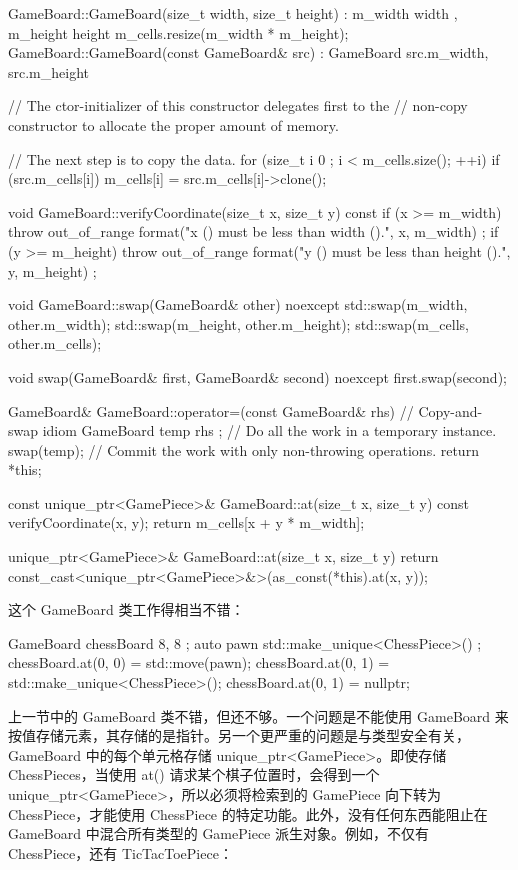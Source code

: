 \begin{cpp}
GameBoard::GameBoard(size_t width, size_t height)
    : m_width { width }, m_height { height }
{
    m_cells.resize(m_width * m_height);
}
GameBoard::GameBoard(const GameBoard& src)
    : GameBoard { src.m_width, src.m_height }
{
    // The ctor-initializer of this constructor delegates first to the
    // non-copy constructor to allocate the proper amount of memory.

    // The next step is to copy the data.
    for (size_t i { 0 }; i < m_cells.size(); ++i) {
        if (src.m_cells[i]) {
            m_cells[i] = src.m_cells[i]->clone();
        }
    }
}

void GameBoard::verifyCoordinate(size_t x, size_t y) const
{
    if (x >= m_width) {
        throw out_of_range {
            format("x ({}) must be less than width ({}).", x, m_width) };
    }
    if (y >= m_height) {
        throw out_of_range {
            format("y ({}) must be less than height ({}).", y, m_height) };
    }
}

void GameBoard::swap(GameBoard& other) noexcept
{
    std::swap(m_width, other.m_width);
    std::swap(m_height, other.m_height);
    std::swap(m_cells, other.m_cells);
}

void swap(GameBoard& first, GameBoard& second) noexcept
{
    first.swap(second);
}

GameBoard& GameBoard::operator=(const GameBoard& rhs)
{
    // Copy-and-swap idiom
    GameBoard temp { rhs }; // Do all the work in a temporary instance.
    swap(temp); // Commit the work with only non-throwing operations.
    return *this;
}

const unique_ptr<GamePiece>& GameBoard::at(size_t x, size_t y) const
{
    verifyCoordinate(x, y);
    return m_cells[x + y * m_width];
}

unique_ptr<GamePiece>& GameBoard::at(size_t x, size_t y)
{
    return const_cast<unique_ptr<GamePiece>&>(as_const(*this).at(x, y));
}
\end{cpp}

这个 GameBoard 类工作得相当不错：

\begin{cpp}
GameBoard chessBoard { 8, 8 };
auto pawn { std::make_unique<ChessPiece>() };
chessBoard.at(0, 0) = std::move(pawn);
chessBoard.at(0, 1) = std::make_unique<ChessPiece>();
chessBoard.at(0, 1) = nullptr;
\end{cpp}


上一节中的 GameBoard 类不错，但还不够。一个问题是不能使用 GameBoard 来按值存储元素，其存储的是指针。另一个更严重的问题是与类型安全有关，GameBoard 中的每个单元格存储 unique\_ptr<GamePiece>。即使存储 ChessPieces，当使用 at() 请求某个棋子位置时，会得到一个 unique\_ptr<GamePiece>，所以必须将检索到的 GamePiece 向下转为 ChessPiece，才能使用 ChessPiece 的特定功能。此外，没有任何东西能阻止在 GameBoard 中混合所有类型的 GamePiece 派生对象。例如，不仅有 ChessPiece，还有 TicTacToePiece：

